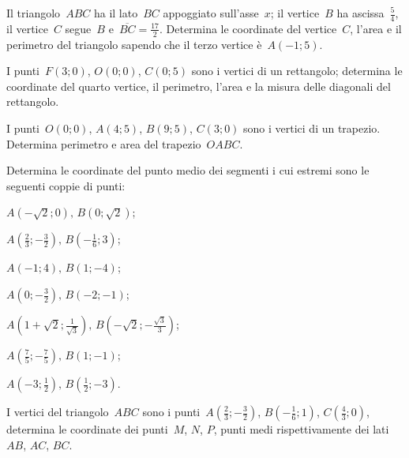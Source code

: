 \begin{esercizio}
\label{ese:\thechapter.31}
Il triangolo~$ABC$ ha il lato~$BC$ appoggiato sull'asse~$x$; il vertice~$B$ ha ascissa~$\frac{5}{4}$,
il vertice~$C$ segue~$B$ e~$\overline{BC}=\frac{17}{2}$. Determina le coordinate del vertice~$C$,
l'area e il perimetro del triangolo sapendo che il terzo vertice è~$A(-1;5)$.
\end{esercizio}

\begin{esercizio}
\label{ese:\thechapter.32}
I punti~$F(3;0)$, $O(0;0)$, $C(0;5)$ sono i vertici di un rettangolo; determina le coordinate del quarto vertice, il perimetro,
l'area e la misura delle diagonali del rettangolo.
\end{esercizio}

\begin{esercizio}
\label{ese:\thechapter.33}
I punti~$O(0;0)$, $A(4;5)$, $B(9;5)$, $C(3;0)$ sono i vertici di un trapezio.
Determina perimetro e area del trapezio~$OABC$.
\end{esercizio}

\begin{esercizio}
\label{ese:\thechapter.34}
Determina le coordinate del punto medio dei segmenti i cui estremi sono le seguenti coppie di punti:
\begin{multicols}{2}
 \begin{enumeratea}
\item $A(-\sqrt{2};0)\text{, }B(0;\sqrt{2})$;
\item $A\left(\frac{2}{3};-\frac{3}{2}\right)\text{, }B\left(-{\frac{1}{6}};3\right)$;
\item $A(-1;4)\text{, }B(1;-4)$;
\item $A\left(0;-\frac{3}{2}\right)\text{, }B\left(-2;-1\right)$;
\item $A\left(1+\sqrt{2};\frac{1}{\sqrt{3}}\right)\text{, }B\left(-\sqrt{2};-\frac{\sqrt{3}}{3}\right)$;
\item $A\left(\frac{7}{5};-\frac{7}{5}\right)\text{, }B(1;-1)$;
\item $A\left(-3;\frac{1}{2}\right)\text{, }B\left(\frac{1}{2};-3\right)$.
\end{enumeratea}
\end{multicols}
\end{esercizio}

\begin{esercizio}
\label{ese:\thechapter.35}
I vertici del triangolo~$ABC$ sono i punti~$A\left(\frac{2}{3};-\frac{3}{2}\right)$, $B\left(-{\frac{1}{6}};1\right)$,
$C\left(\frac{4}{3};0\right)$, determina le coordinate dei punti~$M$, $N$, $P$, punti medi rispettivamente dei lati
$AB$, $AC$, $BC$.
\end{esercizio}

